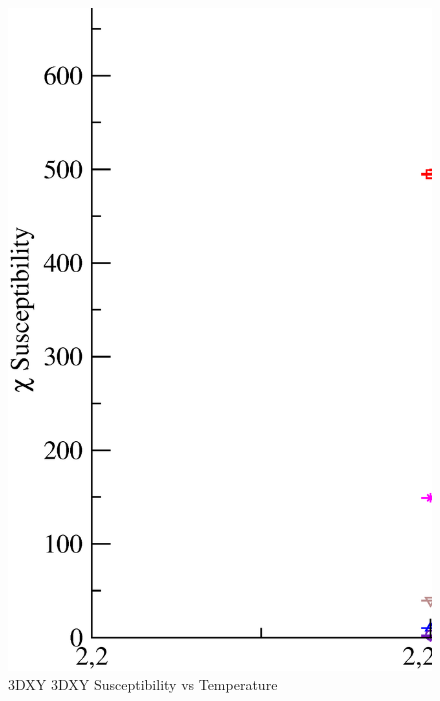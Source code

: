 \begin{figure}[!htpb]
  \centering
  \includegraphics[width=\textwidth]{./plots/3DXY/3DXY_Susceptibility_vs_Temperature.eps}
  \caption{3DXY 3DXY Susceptibility vs Temperature}
\end{figure}

